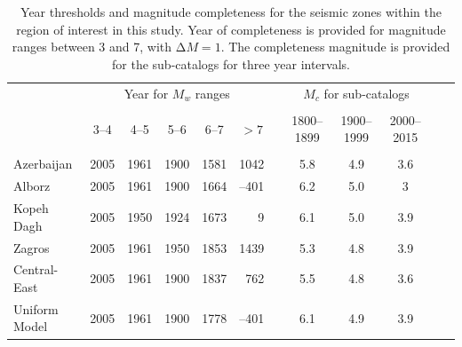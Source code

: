 \begin{table}%
    \centering
    \caption{Year thresholds and magnitude completeness for the seismic zones within the region of interest in this study. Year of completeness is provided for magnitude ranges between 3 and 7, with $\mathrm{\Delta}M = 1$. The completeness magnitude is provided for the sub-catalogs for three year intervals.}
    \begin{tabular}{lccccrcccccc}
        \cline{2-12}                                                                                  			\\[-1.6ex]
                        & \multicolumn{5}{c}{Year for $M_w$ ranges} 
                                                            & & \multicolumn{3}{c}{$M_c$ for sub-catalogs} & & \\
        \cline{2-6} \cline{8-10}                                                                      			\\[-1.6ex]
                        & 3--4 & 4--5 & 5--6 & 6--7 & \multicolumn{1}{c}{$>7$} 
                                                            & & 1800--1899 & 1900--1999 & 2000--2015  	\\[0.6ex]
        \hline                                                                                        			\\[-1.6ex]
        Azerbaijan      & 2005 & 1961 & 1900 & 1581 & 1042  & &     5.8    &    4.9    &     3.6    \\
        Alborz          & 2005 & 1961 & 1900 & 1664 &--401  & &     6.2    &     5.0    &     3    \\
        Kopeh Dagh      & 2005 & 1950 & 1924 & 1673 &    9  & &     6.1    &     5.0    &     3.9    \\
        Zagros          & 2005 & 1961 & 1950 & 1853 & 1439  & &     5.3    &     4.8    &     3.9     \\
        Central-East    & 2005 & 1961 & 1900 & 1837 &  762  & &     5.5    &     4.8    &     3.6   \\
        Uniform Model   & 2005 & 1961 & 1900 & 1778 &--401  & &     6.1    &     4.9    &     3.9   \\[0.5ex]
        \hline 
    \end{tabular}
    \label{tab:completeness} 
\end{table}

